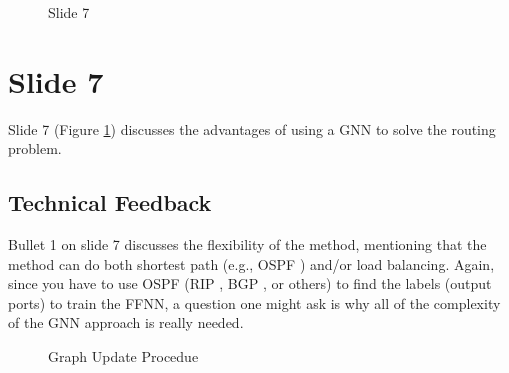 \documentclass[11pt, oneside]{article}   	%
\begin{document}
\begin{figure}[h]
\caption{Slide 7}
\label{fig:slide7}
\end{figure}


\section{Slide 7}
\label{sec:slide7}
Slide 7 (Figure \ref{fig:slide7}) discusses the advantages of using a GNN to solve the routing problem.

\subsection{Technical Feedback}
\label{slide7:technical_feedback}
Bullet 1 on slide 7 discusses the flexibility of the method, mentioning that the method can do both 
shortest path (e.g., OSPF \cite{rfc2328}) and/or load balancing. Again, since you have to use OSPF (RIP \cite{rfc2453}, 
BGP \cite{rfc4271}, or others) to find the labels (output ports) to train the FFNN, a question one might ask is why all of the 
complexity of the GNN approach is really needed.


\begin{figure}
\caption{Graph Update Procedue}
\label{fig:graph_update}
\end{figure}
\end{document}
